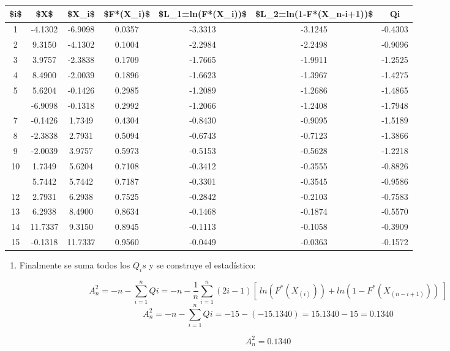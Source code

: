 \documentclass[
  a4paper,
  oneside,
  openany]{book}
\providecommand{\tightlist}{%
  \setlength{\itemsep}{0pt}\setlength{\parskip}{0pt}}
\begin{document}
\begin{table}
\centering
\begin{tabular}{ccccccc}
\toprule
\$i\$ & \$X\$ & \$X\_i\$ & \$F*(X\_i)\$ & \$L\_1=ln(F*(X\_i))\$ & \$L\_2=ln(1-F*(X\_n-i+1))\$ & Qi\\
\midrule
1 & -4.1302 & -6.9098 & 0.0357 & -3.3313 & -3.1245 & -0.4303\\
2 & 9.3150 & -4.1302 & 0.1004 & -2.2984 & -2.2498 & -0.9096\\
3 & 3.9757 & -2.3838 & 0.1709 & -1.7665 & -1.9911 & -1.2525\\
4 & 8.4900 & -2.0039 & 0.1896 & -1.6623 & -1.3967 & -1.4275\\
5 & 5.6204 & -0.1426 & 0.2985 & -1.2089 & -1.2686 & -1.4865\\
\addlinespace
6 & -6.9098 & -0.1318 & 0.2992 & -1.2066 & -1.2408 & -1.7948\\
7 & -0.1426 & 1.7349 & 0.4304 & -0.8430 & -0.9095 & -1.5189\\
8 & -2.3838 & 2.7931 & 0.5094 & -0.6743 & -0.7123 & -1.3866\\
9 & -2.0039 & 3.9757 & 0.5973 & -0.5153 & -0.5628 & -1.2218\\
10 & 1.7349 & 5.6204 & 0.7108 & -0.3412 & -0.3555 & -0.8826\\
\addlinespace
11 & 5.7442 & 5.7442 & 0.7187 & -0.3301 & -0.3545 & -0.9586\\
12 & 2.7931 & 6.2938 & 0.7525 & -0.2842 & -0.2103 & -0.7583\\
13 & 6.2938 & 8.4900 & 0.8634 & -0.1468 & -0.1874 & -0.5570\\
14 & 11.7337 & 9.3150 & 0.8945 & -0.1113 & -0.1058 & -0.3909\\
15 & -0.1318 & 11.7337 & 0.9560 & -0.0449 & -0.0363 & -0.1572\\
\bottomrule
\end{tabular}
\end{table}

\begin{enumerate}
\def\labelenumi{\arabic{enumi})}
\setcounter{enumi}{6}
\tightlist
\item
  Finalmente se suma todos los \(Q_{i}s\) y se construye el estadístico:
\end{enumerate}

\[A_n^2=-n-\sum_{i=1}^{n}Qi=-n-\frac{1}{n}\sum_{i=1}^{n}\left(2i-1\right)[ \ ln(F^*(X_{(i)})) +ln(1-F^*(X_{(n-i+1)})) \ ]\]
\[A_n^2=-n-\sum_{i=1}^{n}Qi=-15-(-15.1340)=15.1340-15=0.1340\]

\[A_n^2=0.1340\]
\end{document}
